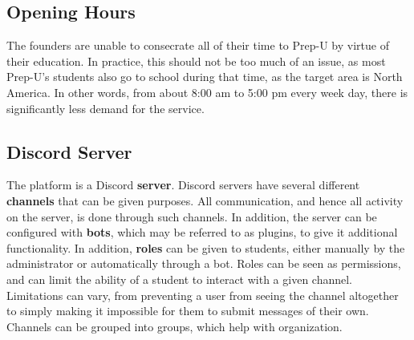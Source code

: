 \documentclass{business}
\begin{document}
    \subsection{Opening Hours}
    The founders are unable to consecrate all of their time to Prep-U by virtue of their education. In practice, this should not be too much of an issue, as most Prep-U’s students also go to school during that time, as the target area is North America. In other words, from about 8:00 am to 5:00 pm every week day, there is significantly less demand for the service.
    \subsection{Discord Server}
    The platform is a Discord \textbf{server}. Discord servers have several different \textbf{channels} that can be given purposes. All communication, and hence all activity on the server, is done through such channels. In addition, the server can be configured with \textbf{bots}, which may be referred to as plugins, to give it additional functionality. In addition, \textbf{roles} can be given to students, either manually by the administrator or automatically through a bot. Roles can be seen as permissions, and can limit the ability of a student to interact with a given channel. Limitations can vary, from preventing a user from seeing the channel altogether to simply making it impossible for them to submit messages of their own. Channels can be grouped into groups, which help with organization.
\end{document}
